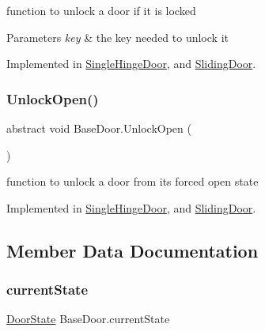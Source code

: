 function to unlock a door if it is locked 


\begin{DoxyParams}{Parameters}
{\em key} & the key needed to unlock it\\
\hline
\end{DoxyParams}


Implemented in \mbox{\hyperlink{class_single_hinge_door_a130d674b08d4b9e8028b08ef2084ab77}{Single\+Hinge\+Door}}, and \mbox{\hyperlink{class_sliding_door_a259817872880d475d54ba9721a6db5cc}{Sliding\+Door}}.

\mbox{\label{class_base_door_aae09177b7a5578ede6d44f758551684e}} 
\subsubsection{\texorpdfstring{Unlock\+Open()}{UnlockOpen()}}
{\footnotesize\ttfamily abstract void Base\+Door.\+Unlock\+Open (\begin{DoxyParamCaption}{ }\end{DoxyParamCaption})\hspace{0.3cm}{\ttfamily [pure virtual]}}



function to unlock a door from it\textquotesingle{}s forced open state 



Implemented in \mbox{\hyperlink{class_single_hinge_door_a5e5785f02f35b8b109d4c50d3f912013}{Single\+Hinge\+Door}}, and \mbox{\hyperlink{class_sliding_door_af3b93ba6356b95277be1913224ad1415}{Sliding\+Door}}.



\subsection{Member Data Documentation}
\mbox{\label{class_base_door_a79de3a0eaae4ea2749f384224dce6692}} 
\subsubsection{\texorpdfstring{current\+State}{currentState}}
{\footnotesize\ttfamily \mbox{\hyperlink{class_base_door_a22e038571daf23b362eb8aaedc78cb43}{Door\+State}} Base\+Door.\+current\+State\hspace{0.3cm}{\ttfamily [protected]}}



